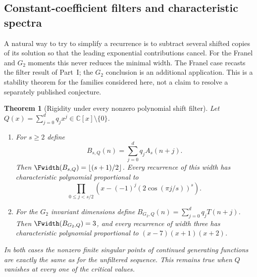 \documentclass[11pt,a4paper]{article}
\newtheorem{theorem}{Theorem}[section]
\theoremstyle{definition}
\theoremstyle{remark}
\numberwithin{equation}{section}
\begin{document}
\subsection{Constant-coefficient filters and characteristic spectra}
\label{B:F:ssec:filter-rigidity}

A natural way to try to simplify a recurrence is to subtract several shifted
copies of its solution so that the leading exponential contributions cancel.
For the Franel and $G_2$ moments this never reduces the minimal width. The Franel case recasts the filter result of Part~I; the $G_2$ conclusion is an additional application. This
is a stability theorem for the families considered here, not a claim to
resolve a separately published conjecture.

\begin{theorem}[Rigidity under every nonzero polynomial shift filter]
\label{B:F:thm:filter-rigidity}
Let $Q(x)=\sum_{j=0}^{d}q_jx^j\in\mathbb C[x]\setminus\{0\}$.
\begin{enumerate}
\item For $s\ge2$ define
\[
 B_{s,Q}(n)=\sum_{j=0}^{d}q_jA_s(n+j).
\]
Then $\Fwidth(B_{s,Q})=\lfloor(s+1)/2\rfloor$. Every recurrence of this
width has characteristic polynomial proportional to
\[
 \prod_{0\le j<s/2}\left(x-(-1)^j(2\cos(\pi j/s))^s\right).
\]
\item For the $G_2$ invariant dimensions define
$B_{G_2,Q}(n)=\sum_{j=0}^{d}q_jT(n+j)$.
Then $\Fwidth(B_{G_2,Q})=3$, and every recurrence of width three has
characteristic polynomial proportional to $(x-7)(x+1)(x+2)$.
\end{enumerate}
In both cases the nonzero finite singular points of continued generating
functions are exactly the same as for the unfiltered sequence. This remains
true when $Q$ vanishes at every one of the critical values.
\end{theorem}
\end{document}
